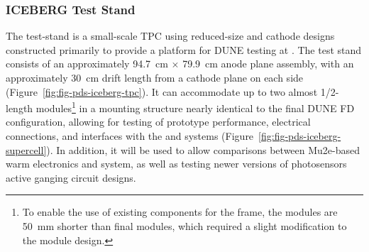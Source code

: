 




% 

\subsubsection{ICEBERG Test Stand}
\label{sec:iceberg-teststand}

The  test-stand is a small-scale TPC using reduced-size   and cathode designs constructed primarily to provide a platform for DUNE  testing at . 
The test stand consists of an approximately \SI{94.7}{cm} $\times$ \SI{79.9}{cm} anode plane assembly, with an approximately \SI{30}{cm} drift length from a cathode plane on each side (Figure~\ref{fig:fig-pds-iceberg-tpc}).  
It can accommodate up to two almost 1/2-length  modules\footnote{To enable the use of existing components for the  frame, the  modules are \SI{50}{mm} shorter than final modules, which required a slight modification to the  module design.} in a mounting structure nearly identical to the final DUNE FD configuration, allowing for testing of  prototype performance, electrical connections, and interfaces with the  and  systems (Figure~\ref{fig:fig-pds-iceberg-supercell}). 
In addition, it will be used to allow comparisons between Mu2e-based warm electronics and   system, as well as testing newer versions of photosensors active ganging circuit designs.


